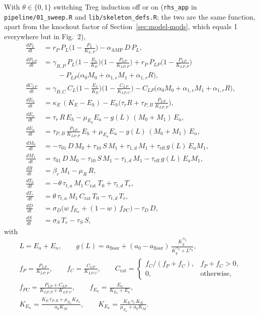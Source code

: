 \documentclass[11pt]{article}
\begin{document}
With $\theta \in \{0,1\}$ switching Treg induction off or on
(\texttt{rhs\_app} in \texttt{pipeline/01\_sweep.R} and \texttt{lib/skeleton\_defs.R};
the two are the same function, apart from the knockout factor of
Section~\ref{sec:model-mods}, which equals 1 everywhere but in Fig.~2),
\begin{align}
\frac{dP_L}{dt} &= r_P\,P_L\Big(1-\frac{P_L}{K_{L,P}}\Big) - \alpha_{\mathrm{AMP}}\,D\,P_L,\\
\frac{dP_{LP}}{dt} &= \gamma_{B,P}\,P_L\Big(1-\frac{E_h}{K_E}\Big)\Big(1-\frac{P_{LP}}{K_{LP,P}}\Big)
  + r_P\,P_{LP}\Big(1-\frac{P_{LP}}{K_{LP,P}}\Big)\nonumber\\
  &\qquad - P_{LP}\big(\alpha_0 M_0 + \alpha_{1,e} M_1 + \alpha_{1,r} R\big),\\
\frac{dC_{LP}}{dt} &= \gamma_{B,C}\,C_L\Big(1-\frac{E_h}{K_E}\Big)\Big(1-\frac{C_{LP}}{K_{LP,C}}\Big)
  - C_{LP}\big(\alpha_0 M_0 + \alpha_{1,e} M_1 + \alpha_{1,r} R\big),\\
\frac{dE_h}{dt} &= \kappa_E\,(K_E - E_h) - E_h\Big(\tau_r R + \tau_{P,B}\,\frac{P_{LP}}{K_{LP,P}}\Big),\\
\frac{dE_a}{dt} &= \tau_r\,R\,E_h - \mu_{E_a} E_a - g(L)\,(M_0+M_1)\,E_a,\\
\frac{dE_n}{dt} &= \tau_{P,B}\,\frac{P_{LP}}{K_{LP,P}}\,E_h + \mu_{E_a} E_a - g(L)\,(M_0+M_1)\,E_n,\\
\frac{dM_0}{dt} &= -\tau_{01}\,D\,M_0 + \tau_{10}\,S\,M_1 + \tau_{1,d}\,M_1 + \tau_{\mathrm{eff}}\,g(L)\,E_a M_1,\\
\frac{dM_1}{dt} &= \tau_{01}\,D\,M_0 - \tau_{10}\,S\,M_1 - \tau_{1,d}\,M_1 - \tau_{\mathrm{eff}}\,g(L)\,E_a M_1,\\
\frac{dR}{dt} &= \beta_r\,M_1 - \mu_R\,R,\\
\frac{dT_0}{dt} &= -\theta\,\tau_{t,a}\,M_1\,C_{\mathrm{rat}}\,T_0 + \tau_{t,d}\,T_r,\\
\frac{dT_r}{dt} &= \theta\,\tau_{t,a}\,M_1\,C_{\mathrm{rat}}\,T_0 - \tau_{t,d}\,T_r,\\
\frac{dD}{dt} &= \sigma_D\big(w\,f_{E_n} + (1-w)\,f_{PC}\big) - \tau_D\,D,\\
\frac{dS}{dt} &= \sigma_S\,T_r - \tau_S\,S,
\label{eq:model-last}
\end{align}
with
\begin{gather}
L = E_a + E_n,\qquad
g(L) = a_{\mathrm{floor}} + (a_0 - a_{\mathrm{floor}})\,\frac{K_g^{\,n_g}}{K_g^{\,n_g} + L^{n_g}},
\label{eq:g}\\
f_P = \frac{P_{LP}}{K_{LP,P}},\qquad f_C = \frac{C_{LP}}{K_{LP,C}},\qquad
C_{\mathrm{rat}} = \begin{cases} f_C/(f_P+f_C), & f_P + f_C > 0,\\ 0, & \text{otherwise},\end{cases}\nonumber\\
f_{PC} = \frac{P_{LP} + C_{LP}}{K_{LP,P} + K_{LP,C}},\qquad
f_{E_n} = \frac{E_n}{K_{E_n} + E_n},\nonumber\\
K_{E_n} = \frac{K_E\,\tau_{P,B} + \mu_{E_a} K_{E_a}}{a_0 K_M},\qquad
K_{E_a} = \frac{K_E\,\tau_r\,K_R}{\mu_{E_a} + a_0 K_M}.
\label{eq:KEaKEn}
\end{gather}
\end{document}
